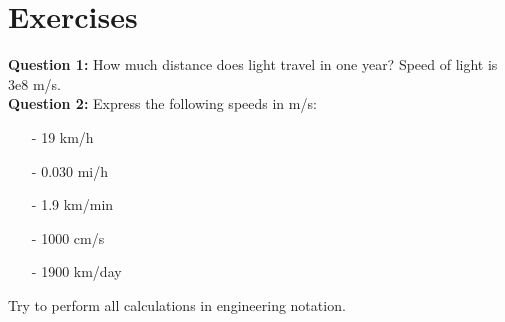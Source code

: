 \documentclass[12pt,a4paper]{article}
\begin{document}
\section{Exercises}
\noindent\textbf{Question 1:} How much distance does light travel in one year? Speed of light is $3\mathrm{e}8$ m/s.\\
\noindent\textbf{Question 2:} Express the following speeds in m/s:\\
\begin{enumerate}
\item[-] 19 km/h
\item[-] 0.030 mi/h
\item[-] 1.9 km/min
\item[-] 1000 cm/s
\item[-] 1900 km/day
\end{enumerate}
Try to perform all calculations in engineering notation.


\end{document}
